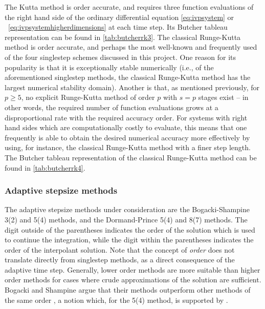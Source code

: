 The Kutta method is  order accurate, and requires three function
evaluations of the right hand side of the ordinary differential equation
\eqref{eq:ivpsystem} or ~\eqref{eq:ivpsystemhigherdimensions} at each time
step. Its Butcher tableau representation can be found in \cref{tab:butcherrk3}.
The classical Runge-Kutta method is  order accurate, and perhaps the most
well-known and frequently used of the four singlestep schemes discussed in this
project. One reason for its popularity is that it is exceptionally stable
numerically (i.e., of the aforementioned singlestep methods, the classical
Runge-Kutta method has the largest numerical stability domain). Another is that,
as mentioned previously, for $p\geq5$, no explicit Runge-Kutta method of order
$p$ with $s=p$ stages exist
\parencite[p.173]{hairer1993solving} -- in other words,
the required number of function evaluations grows at a disproportional rate with
the required accuracy order. For systems with right hand sides which are
computationally costly to evaluate, this means that one frequently is able to
obtain the desired numerical accuracy more effectively by using, for instance,
the classical Runge-Kutta method with a finer step length. The Butcher tableau
representation of the classical Runge-Kutta method can be found in
\cref{tab:butcherrk4}.





\subsubsection{Adaptive stepsize methods}
\label{ssub:adaptive_stepsize_methods}

The adaptive stepsize methods under consideration are the Bogacki-Shampine
3(2) and 5(4) methods, and the Dormand-Prince 5(4) and 8(7) methods. The digit
outside of the parentheses indicates the order of the solution which is used
to continue the integration, while the digit within the parentheses indicates
the order of the interpolant solution. Note that the concept of \emph{order}
does not translate directly from singlestep methods, as a direct consequence
of the adaptive time step. Generally, lower order methods are more
suitable than higher order methods for cases where crude approximations of the
solution are sufficient. Bogacki and Shampine argue that their methods
outperform other methods of the same order
\parencite{bogacki1989pair,bogacki1996efficient}, a notion which, for the 5(4)
method, is supported by
\textcite[p.194]{hairer1993solving}.

